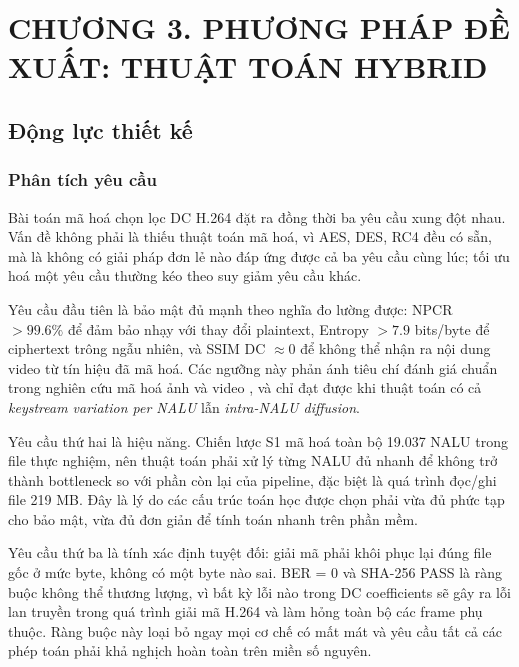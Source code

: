 \clearpage
{}
\section*{CHƯƠNG 3. PHƯƠNG PHÁP ĐỀ XUẤT: THUẬT TOÁN HYBRID}
\setcounter{section}{3}
\setcounter{subsection}{0}
\setcounter{figure}{0}
\setcounter{table}{0}
\setcounter{equation}{0}

\subsection{Động lực thiết kế}

\subsubsection{Phân tích yêu cầu}

Bài toán mã hoá chọn lọc DC H.264 đặt ra đồng thời ba yêu cầu xung đột nhau. Vấn đề không phải là thiếu thuật toán mã hoá, vì AES, DES, RC4 đều có sẵn, mà là không có giải pháp đơn lẻ nào đáp ứng được cả ba yêu cầu cùng lúc; tối ưu hoá một yêu cầu thường kéo theo suy giảm yêu cầu khác.

Yêu cầu đầu tiên là bảo mật đủ mạnh theo nghĩa đo lường được: NPCR $> 99.6\%$ để đảm bảo nhạy với thay đổi plaintext, Entropy $> 7.9$ bits/byte để ciphertext trông ngẫu nhiên, và SSIM DC $\approx 0$ để không thể nhận ra nội dung video từ tín hiệu đã mã hoá. Các ngưỡng này phản ánh tiêu chí đánh giá chuẩn trong nghiên cứu mã hoá ảnh và video \cite{Wu2011}, và chỉ đạt được khi thuật toán có cả \emph{keystream variation per NALU} lẫn \emph{intra-NALU diffusion}.

Yêu cầu thứ hai là hiệu năng. Chiến lược S1 mã hoá toàn bộ 19.037 NALU trong file thực nghiệm, nên thuật toán phải xử lý từng NALU đủ nhanh để không trở thành bottleneck so với phần còn lại của pipeline, đặc biệt là quá trình đọc/ghi file 219 MB. Đây là lý do các cấu trúc toán học được chọn phải vừa đủ phức tạp cho bảo mật, vừa đủ đơn giản để tính toán nhanh trên phần mềm.

Yêu cầu thứ ba là tính xác định tuyệt đối: giải mã phải khôi phục lại đúng file gốc ở mức byte, không có một byte nào sai. BER = 0 và SHA-256 PASS là ràng buộc không thể thương lượng, vì bất kỳ lỗi nào trong DC coefficients sẽ gây ra lỗi lan truyền trong quá trình giải mã H.264 và làm hỏng toàn bộ các frame phụ thuộc. Ràng buộc này loại bỏ ngay mọi cơ chế có mất mát và yêu cầu tất cả các phép toán phải khả nghịch hoàn toàn trên miền số nguyên.

